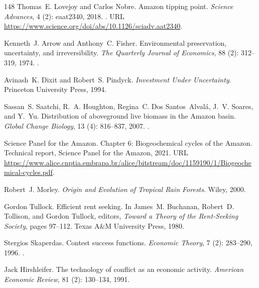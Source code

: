 \documentclass[11pt]{article}
\theoremstyle{plain}
\theoremstyle{definition}
\theoremstyle{remark}
\begin{document}
\begin{thebibliography}{148}
Thomas~E. Lovejoy and Carlos Nobre.
\newblock Amazon tipping point.
\newblock \emph{Science Advances}, 4 (2): eaat2340, 2018.
\newblock {}.
\newblock URL \url{https://www.science.org/doi/abs/10.1126/sciadv.aat2340}.

Kenneth~J. Arrow and Anthony~C. Fisher.
\newblock Environmental preservation, uncertainty, and irreversibility.
\newblock \emph{The Quarterly Journal of Economics}, 88 (2):
  312--319, 1974.
\newblock {}.

Avinash~K. Dixit and Robert~S. Pindyck.
\newblock \emph{Investment Under Uncertainty}.
\newblock Princeton University Press, 1994.

Sassan~S. Saatchi, R.~A. Houghton, Regina~C. Dos Santos~Alval{\'a}, J.~V.
  Soares, and Y.~Yu.
\newblock Distribution of aboveground live biomass in the {Amazon} basin.
\newblock \emph{Global Change Biology}, 13 (4): 816--837,
  2007.
\newblock {}.

{Science Panel for the Amazon}.
\newblock Chapter 6: Biogeochemical cycles of the {Amazon}.
\newblock Technical report, Science Panel for the Amazon, 2021.
\newblock URL
  \url{https://www.alice.cnptia.embrapa.br/alice/bitstream/doc/1159190/1/Biogeochemical-cycles.pdf}.

Robert~J. Morley.
\newblock \emph{Origin and Evolution of Tropical Rain Forests}.
\newblock Wiley, 2000.

Gordon Tullock.
\newblock Efficient rent seeking.
\newblock In James~M. Buchanan, Robert~D. Tollison, and Gordon Tullock,
  editors, \emph{Toward a Theory of the Rent-Seeking Society}, pages 97--112.
  Texas A\&M University Press, 1980.

Stergios Skaperdas.
\newblock Contest success functions.
\newblock \emph{Economic Theory}, 7 (2): 283--290, 1996.
\newblock {}.

Jack Hirshleifer.
\newblock The technology of conflict as an economic activity.
\newblock \emph{American Economic Review}, 81 (2): 130--134,
  1991.


\end{thebibliography}
\end{document}
